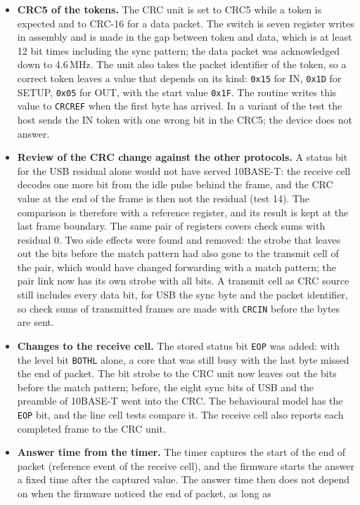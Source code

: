 \documentclass[10pt,a4paper]{article}
\newcommand{\reg}[1]{\texttt{#1}}
\begin{document}
\begin{itemize}
\item \textbf{CRC5 of the tokens.} The CRC unit is set to CRC5 while a token is expected and to CRC-16 for a data
packet. The switch is seven register writes in assembly and is made in the gap between token and data, which
is at least 12 bit times including the sync pattern; the data packet was acknowledged down to 4.6\,MHz. The
unit also takes the packet identifier of the token, so a correct token leaves a value that depends on its
kind: \texttt{0x15} for IN, \texttt{0x1D} for SETUP, \texttt{0x05} for OUT, with the start value \texttt{0x1F}.
The routine writes this value to \reg{CRCREF} when the first byte has arrived. In a variant of the test the
host sends the IN token with one wrong bit in the CRC5; the device does not answer.
\item \textbf{Review of the CRC change against the other protocols.} A status bit for the USB residual alone
would not have served 10BASE-T: the receive cell decodes one more bit from the idle pulse behind the frame,
and the CRC value at the end of the frame is then not the residual (test 14). The comparison is therefore
with a reference register, and its result is kept at the last frame boundary. The same pair of registers
covers check sums with residual 0. Two side effects were found and removed: the strobe that leaves out the
bits before the match pattern had also gone to the transmit cell of the pair, which would have changed
forwarding with a match pattern; the pair link now has its own strobe with all bits. A transmit cell as CRC
source still includes every data bit, for USB the sync byte and the packet identifier, so check sums of
transmitted frames are made with \reg{CRCIN} before the bytes are sent.
\item \textbf{Changes to the receive cell.} The stored status bit \reg{EOP} was added: with the level bit
\reg{BOTHL} alone, a core that was still busy with the last byte missed the end of packet. The bit strobe to
the CRC unit now leaves out the bits before the match pattern; before, the eight sync bits of USB and the
preamble of 10BASE-T went into the CRC. The behavioural model has the \reg{EOP} bit, and the line cell tests
compare it. The receive cell also reports each completed frame to the CRC unit.
\item \textbf{Answer time from the timer.} The timer captures the start of the end of packet (reference event of
the receive cell), and the firmware starts the answer a fixed time after the captured value. The answer time then does not depend on when the firmware noticed the end of packet, as long as

\end{itemize}
\end{document}
